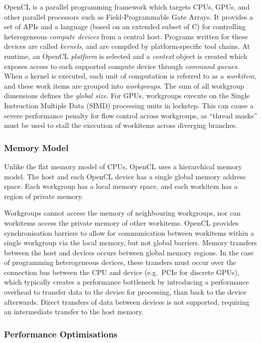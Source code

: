 OpenCL is a parallel programming framework which targets CPUs, GPUs,
and other parallel processors such as Field-Programmable Gate
Arrays. It provides a set of APIs and a language (based on an extended
subset of C) for controlling heterogeneous \emph{compute devices} from
a central host. Programs written for these devices are called
\emph{kernels}, and are compiled by platform-specific tool chains. At
runtime, an OpenCL \emph{platform} is selected and a \emph{context}
object is created which exposes access to each supported compute
device through \emph{command queues}.  When a kernel is executed, each
unit of computation is referred to as a \emph{workitem}, and these
work items are grouped into \emph{workgroups}. The sum of all
workgroup dimensions defines the \emph{global size}. For GPUs,
workgroups execute on the Single Instruction Multiple Data (SIMD)
processing units in lockstep. This can cause a severe performance
penalty for flow control across workgroups, as ``thread masks'' must
be used to stall the execution of workitems across diverging branches.


\subsubsection{Memory Model}

Unlike the flat memory model of CPUs, OpenCL uses a hierarchical
memory model. The host and each OpenCL device has a single global
memory address space. Each workgroup has a local memory space, and
each workitem has a region of private memory.

Workgroups cannot access the memory of neighbouring workgroups, nor
can workitems access the private memory of other workitems. OpenCL
provides synchronisation barriers to allow for communication between
workitems within a single workgroup via the local memory, but not
global barriers. Memory transfers between the host and devices occurs
between global memory regions. In the case of programming
heterogeneous devices, these transfers must occur over the connection
bus between the CPU and device (e.g.\ PCIe for discrete GPUs), which
typically creates a performance bottleneck by introducing a
performance overhead to transfer data to the device for processing,
than back to the device afterwards. Direct transfers of data between
devices is not supported, requiring an intermediate transfer to the
host memory.


\subsubsection{Performance Optimisations}

